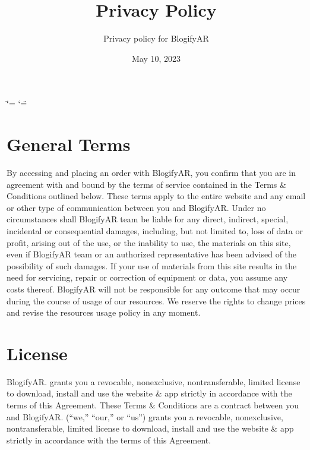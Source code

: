 \documentclass[letterpaper,11pt,openany,oneside,english,openany]{sphinxmanual}
\title{Privacy Policy}
\date{May 10, 2023}
\author{Privacy policy for BlogifyAR}
\begin{document}
\ifdefined\shorthandoff
  \ifnum\catcode`\=\string=\active\shorthandoff{=}\fi
  \ifnum\catcode`\"=\active{}\fi
\fi

\pagestyle{empty}
\sphinxmaketitle
\pagestyle{plain}
\sphinxtableofcontents
\pagestyle{normal}
\label{\detokenize{privacy_policy::doc}}





\chapter{\sphinxhyphen{}General Terms}
\label{\detokenize{privacy_policy:general-terms}}
\sphinxAtStartPar
By accessing and placing an order with BlogifyAR, you confirm that you are in agreement with and bound by the terms of
service contained in the Terms \& Conditions outlined below. These terms apply to the entire website and any email or other
type of communication between you and BlogifyAR.
Under no circumstances shall BlogifyAR team be liable for any direct, indirect, special, incidental or consequential damages,
including, but not limited to, loss of data or profit, arising out of the use, or the inability to use, the materials on this site, even
if BlogifyAR team or an authorized representative has been advised of the possibility of such damages. If your use of
materials from this site results in the need for servicing, repair or correction of equipment or data, you assume any costs
thereof.
BlogifyAR will not be responsible for any outcome that may occur during the course of usage of our resources. We reserve
the rights to change prices and revise the resources usage policy in any moment.


\chapter{\sphinxhyphen{}License}
\label{\detokenize{privacy_policy:license}}
\sphinxAtStartPar
BlogifyAR. grants you a revocable, non\sphinxhyphen{}exclusive, non\sphinxhyphen{}transferable, limited license to download, install and use the website
\& app strictly in accordance with the terms of this Agreement. These Terms \& Conditions are a contract between you and
BlogifyAR. (“we,” “our,” or “us”) grants you a revocable, non\sphinxhyphen{}exclusive, non\sphinxhyphen{}transferable, limited license to download, install
and use the website \& app strictly in accordance with the terms of this Agreement.
\end{document}
